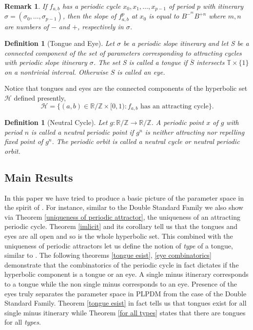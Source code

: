 \documentclass[12pt]{amsart}
\newtheorem{remark}{Remark}
\numberwithin{equation}{section}
\newtheorem{definition}[theorem]{Definition}
\theoremstyle{remark}
\begin{document}
\begin{remark}
    If  $f_{a,b}$ has a periodic  cycle $x_0, x_1,\ldots, x_{p-1}$   of period $p$ with itinerary $\sigma=(\sigma_0,\ldots,\sigma_{p-1})$, then the slope of $f_{a,b}^p$ at $x_0$ is equal to $B^{-^{m}}B^{+{n}}$ where $m,n$ are numbers of $-$ and $+$, respectively in $\sigma$.
\end{remark}

\begin{definition}[Tongue and Eye]
     Let $\sigma$ be a periodic slope itinerary and let S be a connected component of the set of parameters corresponding to attracting cycles with periodic slope itinerary $\sigma$. The set S is called a
tongue if $\overline{S}$ intersects $\mathbb{T}\times \{1\}$ on a nontrivial interval. Otherwise $S$ is called an
eye.
\end{definition}

Notice that tongues and eyes are the connected components of the hyperbolic set $\mathcal{H}$ defined presently,
\[\mathcal{H}= \{ (a,b) \in \mathbb R/\mathbb{Z} \times [0,1) : f_{a,b} \text{ has an attracting cycle} \}.\] 

\begin{definition}[Neutral Cycle]\label{neutral cycle}
   Let $ g: \mathbb{R/Z} \to \mathbb{R/ Z} $. A periodic point $x$ of $g$ with period $n$ is called a neutral periodic point if $g^n$ is neither attracting nor repelling fixed point of $g^n$. The periodic orbit is called a neutral cycle or neutral periodic orbit.

    
\end{definition}






\subsection{Main Results}
\vspace{.3cm}
In this paper we have  tried to produce  a basic picture of the parameter space in the spirit of \cite{MR}. For instance, similar to the Double Standard Family we also show via Theorem \ref{uniqueness of periodic attractor}, the uniqueness of an attracting periodic cycle. Theorem \ref{imlicit} and its corollary tell us that the tongues and eyes are all open and so is the whole hyperbolic set. This combined with the uniqueness of periodic attractors let us define the notion of \textit{type} of a tongue, similar to  \cite{MR}. The following theorems \ref{tongue esist}, \ref{eye combinatorics}  demonstrate that the combinatorics of the periodic cycle in fact dictates if the hyperbolic component is a tongue or an eye.  A single minus itinerary corresponds to a tongue while the non single minus corresponds to an eye. Presence of the eyes  truly  separates the 
 parameter space in PLPDM from the case of  the  Double Standard Family. Theorem \ref{tongue esist} in fact tells us that tongues exist for all single minus itinerary while Theorem \ref{for all types} states that there are tongues for all \textit{types}. 
\end{document}
